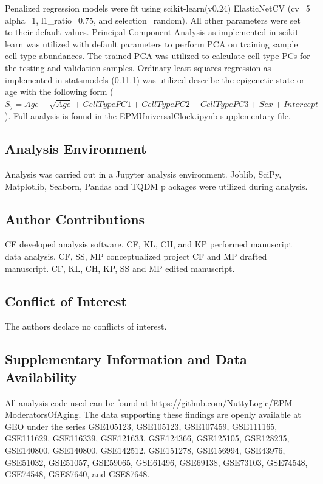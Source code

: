 \documentclass{article}
\begin{document}
{\begin{linenumbers}
Penalized regression models were fit using scikit-learn(v0.24)\cite{Pedregosa2011-fi} 
ElasticNetCV (cv=5 alpha=1, l1\_ratio=0.75, and selection=random). All other parameters were set to their 
default values. Principal Component Analysis as implemented in scikit-learn was utilized with default parameters 
to perform PCA on training sample cell type abundances. The trained PCA was utilized to calculate cell type PCs 
for the testing and validation samples. Ordinary least squares regression as implemented in statsmodels 
(0.11.1)\cite{Seabold2010-lt} was utilized describe the epigenetic state or age with the following 
form ($S_j  = Age + \sqrt{Age} + Cell Type PC1 + Cell Type PC2 + Cell Type PC3 + Sex + Intercept$). 
Full analysis is found in the EPMUniversalClock.ipynb supplementary file. 

\subsection{Analysis Environment}

Analysis was carried out in a Jupyter\cite{Basu_undated-vq} analysis environment.
 Joblib\cite{Varoquaux2009-al}, SciPy\cite{Virtanen2020-wt}, Matplotlib\cite{Hunter2007-nq}, 
 Seaborn\cite{Waskom2021-gj}, Pandas\cite{McKinney2012-ta} and TQDM\cite{Da_Costa-Luis2019-lr} p
 ackages were utilized during analysis. 

\subsection{Author Contributions}
CF developed analysis software. CF, KL, CH, and KP performed manuscript data analysis. 
CF, SS, MP conceptualized project CF and MP drafted manuscript. CF, KL, CH, KP, SS and MP edited manuscript.

\subsection{Conflict of Interest}
The authors declare no conflicts of interest.


\subsection{Supplementary Information and Data Availability}

All analysis code used can be found at https://github.com/NuttyLogic/EPM-ModeratorsOfAging. The data supporting these 
findings are openly available at GEO under the series GSE105123, GSE105123, GSE107459, GSE111165, GSE111629, GSE116339, 
GSE121633, GSE124366, GSE125105, GSE128235, GSE140800, GSE140800, GSE142512, GSE151278, GSE156994, GSE43976, GSE51032, 
GSE51057, GSE59065, GSE61496, GSE69138, GSE73103, GSE74548, GSE74548, GSE87640, and GSE87648.


\end{linenumbers}}
\end{document}
